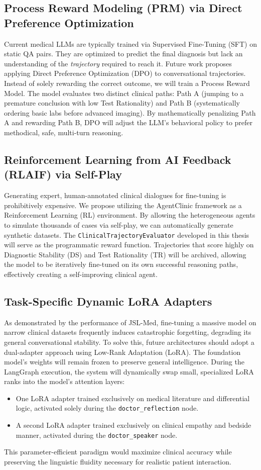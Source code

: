 \documentclass[12pt, a4paper, twoside]{report}
\begin{document}
\subsection{Process Reward Modeling (PRM) via Direct Preference Optimization}
Current medical LLMs are typically trained via Supervised Fine-Tuning (SFT) on static QA pairs. They are optimized to predict the final diagnosis but lack an understanding of the \textit{trajectory} required to reach it. Future work proposes applying Direct Preference Optimization (DPO) to conversational trajectories. Instead of solely rewarding the correct outcome, we will train a Process Reward Model. The model evaluates two distinct clinical paths: Path A (jumping to a premature conclusion with low Test Rationality) and Path B (systematically ordering basic labs before advanced imaging). By mathematically penalizing Path A and rewarding Path B, DPO will adjust the LLM's behavioral policy to prefer methodical, safe, multi-turn reasoning.

\subsection{Reinforcement Learning from AI Feedback (RLAIF) via Self-Play}
Generating expert, human-annotated clinical dialogues for fine-tuning is prohibitively expensive. We propose utilizing the AgentClinic framework as a Reinforcement Learning (RL) environment. By allowing the heterogeneous agents to simulate thousands of cases via self-play, we can automatically generate synthetic datasets. The \texttt{ClinicalTrajectoryEvaluator} developed in this thesis will serve as the programmatic reward function. Trajectories that score highly on Diagnostic Stability (DS) and Test Rationality (TR) will be archived, allowing the model to be iteratively fine-tuned on its own successful reasoning paths, effectively creating a self-improving clinical agent.

\subsection{Task-Specific Dynamic LoRA Adapters}
As demonstrated by the performance of JSL-Med, fine-tuning a massive model on narrow clinical datasets frequently induces catastrophic forgetting, degrading its general conversational stability. To solve this, future architectures should adopt a dual-adapter approach using Low-Rank Adaptation (LoRA). The foundation model's weights will remain frozen to preserve general intelligence. During the LangGraph execution, the system will dynamically swap small, specialized LoRA ranks into the model's attention layers:
\begin{itemize}
    \item One LoRA adapter trained exclusively on medical literature and differential logic, activated solely during the \texttt{doctor\_reflection} node.
    \item A second LoRA adapter trained exclusively on clinical empathy and bedside manner, activated during the \texttt{doctor\_speaker} node.
\end{itemize}
This parameter-efficient paradigm would maximize clinical accuracy while preserving the linguistic fluidity necessary for realistic patient interaction.
\end{document}
